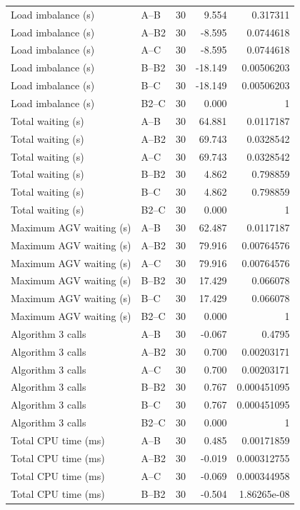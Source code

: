 \begin{table}[t]
\begin{tabular}{llrrr}
Load imbalance (s) & A--B & 30 & 9.554 & 0.317311 \\
Load imbalance (s) & A--B2 & 30 & -8.595 & 0.0744618 \\
Load imbalance (s) & A--C & 30 & -8.595 & 0.0744618 \\
Load imbalance (s) & B--B2 & 30 & -18.149 & 0.00506203 \\
Load imbalance (s) & B--C & 30 & -18.149 & 0.00506203 \\
Load imbalance (s) & B2--C & 30 & 0.000 & 1 \\
Total waiting (s) & A--B & 30 & 64.881 & 0.0117187 \\
Total waiting (s) & A--B2 & 30 & 69.743 & 0.0328542 \\
Total waiting (s) & A--C & 30 & 69.743 & 0.0328542 \\
Total waiting (s) & B--B2 & 30 & 4.862 & 0.798859 \\
Total waiting (s) & B--C & 30 & 4.862 & 0.798859 \\
Total waiting (s) & B2--C & 30 & 0.000 & 1 \\
Maximum AGV waiting (s) & A--B & 30 & 62.487 & 0.0117187 \\
Maximum AGV waiting (s) & A--B2 & 30 & 79.916 & 0.00764576 \\
Maximum AGV waiting (s) & A--C & 30 & 79.916 & 0.00764576 \\
Maximum AGV waiting (s) & B--B2 & 30 & 17.429 & 0.066078 \\
Maximum AGV waiting (s) & B--C & 30 & 17.429 & 0.066078 \\
Maximum AGV waiting (s) & B2--C & 30 & 0.000 & 1 \\
Algorithm 3 calls & A--B & 30 & -0.067 & 0.4795 \\
Algorithm 3 calls & A--B2 & 30 & 0.700 & 0.00203171 \\
Algorithm 3 calls & A--C & 30 & 0.700 & 0.00203171 \\
Algorithm 3 calls & B--B2 & 30 & 0.767 & 0.000451095 \\
Algorithm 3 calls & B--C & 30 & 0.767 & 0.000451095 \\
Algorithm 3 calls & B2--C & 30 & 0.000 & 1 \\
Total CPU time (ms) & A--B & 30 & 0.485 & 0.00171859 \\
Total CPU time (ms) & A--B2 & 30 & -0.019 & 0.000312755 \\
Total CPU time (ms) & A--C & 30 & -0.069 & 0.000344958 \\
Total CPU time (ms) & B--B2 & 30 & -0.504 & 1.86265e-08 \\

\end{tabular}
\end{table}
